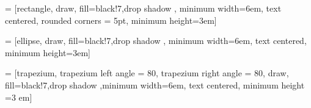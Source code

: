  = [rectangle, draw, fill=black!7,drop shadow , minimum width=6em, text centered, rounded corners = 5pt, minimum height=3em] 

\newcommand{\Variable}[5]{
    \ifthenelse{\equal{#4}{}}{\def \nd {2}}{\def \nd {#4}}
    
    \ifthenelse{\equal{#2}{} \AND \equal{#3}{}}{\def \posL {node distance}, \def \posR {\nd cm}}{\def \posL {#2}, \def \posR {#3}}
    
    \node [instancevariable,\posL = \posR, node distance = \nd cm, #5] (#1) {#1};
}


 = [ellipse, draw, fill=black!7,drop shadow ,  minimum width=6em, text centered, minimum height=3em]

\newcommand{\Method}[5]{
    \ifthenelse{\equal{#4}{}}{\def \nd {2}}{\def \nd {#4}}
    
    \ifthenelse{\equal{#2}{} \AND \equal{#3}{}}{\def \posL {node distance}, \def \posR {\nd cm}}{\def \posL {#2}, \def \posR {#3}}
    \node [instancemethod,\posL = \posR, node distance = \nd cm, #5] (#1) {#1}
}

 = [trapezium, trapezium left angle = 80, trapezium right angle = 80,  draw, fill=black!7,drop shadow ,minimum width=6em, text centered, minimum height =3 em]

\newcommand{\View}[5]{
    
    \ifthenelse{\equal{#4}{}}{\def \nd {2}}{\def \nd {#4}}
    
    \ifthenelse{\equal{#2}{} \AND \equal{#3}{}}{\def \posL {node distance}, \def \posR {\nd cm}}{\def \posL {#2}, \def \posR {#3}}
    
    \node [instanceview, \posL = \posR, node distance = \nd cm, #5] (#1) {#1}
}


\newcommand{\Coordinate}[5]{
    \ifthenelse{\equal{#4}{}}{\def \nd {2}}{\def \nd {#4}}
    
    \ifthenelse{\equal{#2}{} \AND \equal{#3}{}}{\def \posL {node distance}, \def \posR {\nd cm}}{\def \posL {#2}, \def \posR {#3}}
    
    \coordinate [ \posL = \posR, node distance = \nd cm, #5] (#1) {}
}